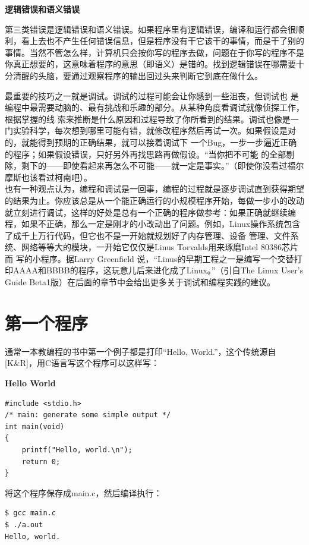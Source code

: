 \documentclass[12pt]{book}
\begin{document}
\textbf{逻辑错误和语义错误}

第三类错误是逻辑错误和语义错误。如果程序里有逻辑错误，编译和运行都会很顺利，看上去也不产生任何错误信息，但是程序没有干它该干的事情，而是干了别的事情。当然不管怎么样，计算机只会按你写的程序去做，问题在于你写的程序不是你真正想要的，这意味着程序的意思（即语义）是错的。找到逻辑错误在哪需要十分清醒的头脑，要通过观察程序的输出回过头来判断它到底在做什么。

最重要的技巧之一就是调试。调试的过程可能会让你感到一些沮丧，但调试也
是编程中最需要动脑的、最有挑战和乐趣的部分。从某种角度看调试就像侦探工作，根据掌握的线
索来推断是什么原因和过程导致了你所看到的结果。调试也像是一门实验科学，每次想到哪里可能有错，就修改程序然后再试一次。如果假设是对的，就能得到预期的正确结果，就可以接着调试下
一个Bug，一步一步逼近正确的程序；如果假设错误，只好另外再找思路再做假设。``当你把不可能
的全部剔除，剩下的------即使看起来再怎么不可能------就一定是事实。''（即使你没看过福尔摩斯也该看过柯南吧）。\\
也有一种观点认为，编程和调试是一回事，编程的过程就是逐步调试直到获得期望的结果为止。你应该总是从一个能正确运行的小规模程序开始，每做一步小的改动就立刻进行调试，这样的好处是总有一个正确的程序做参考：如果正确就继续编程，如果不正确，那么一定是刚才的小改动出了问题。例如，Linux操作系统包含了成千上万行代码，但它也不是一开始就规划好了内存管理、设备
管理、文件系统、网络等等大的模块，一开始它仅仅是Linus
Torvalds用来琢磨Intel 80386芯片而 写的小程序。据Larry Greenfield
说，``Linus的早期工程之一是编写一个交替打印AAAA和BBBB的程序，这玩意儿后来进化成了Linux。''（引自The
Linux User's Guide
Beta1版）在后面的章节中会给出更多关于调试和编程实践的建议。


\section{第一个程序}

通常一本教编程的书中第一个例子都是打印``Hello, World.''，这个传统源自{[}K\&R{]}，用C语言写这个程序可以这样写：

\textbf{Hello World}

\begin{verbatim}
#include <stdio.h>
/* main: generate some simple output */
int main(void)
{
	printf("Hello, world.\n");
	return 0;
}
\end{verbatim}
将这个程序保存成main.c，然后编译执行：
\begin{verbatim}
$ gcc main.c
$ ./a.out
Hello, world.
\end{verbatim}
\end{document}
